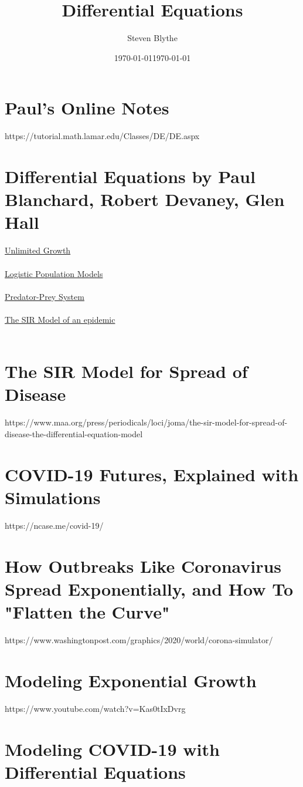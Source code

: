 \documentclass{article}
\title{Differential Equations}
\date{\today}
\author{Steven Blythe}
\date{\today}
\begin{document}
\section{Paul's Online Notes}
https://tutorial.math.lamar.edu/Classes/DE/DE.aspx\\

\section{Differential Equations by Paul Blanchard, Robert Devaney, Glen Hall}
\underline{Unlimited Growth}\\ %
\\
\underline{Logistic Population Models}\\ %
\\
\underline{Predator-Prey System}\\ %
\\
\underline{The SIR Model of an epidemic}\\ %
\\

\section{The SIR Model for Spread of Disease}
https://www.maa.org/press/periodicals/loci/joma/the-sir-model-for-spread-of-disease-the-differential-equation-model\\


\section{COVID-19 Futures, Explained with Simulations}
https://ncase.me/covid-19/\\


\section{How Outbreaks Like Coronavirus Spread Exponentially, and How To "Flatten the Curve"}
https://www.washingtonpost.com/graphics/2020/world/corona-simulator/\\


\section{Modeling Exponential Growth}
https://www.youtube.com/watch?v=Kas0tIxDvrg\\


\section{Modeling COVID-19 with Differential Equations}
\end{document}
